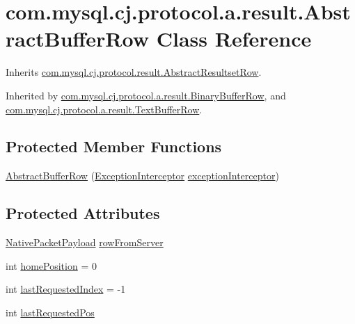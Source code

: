 \hypertarget{classcom_1_1mysql_1_1cj_1_1protocol_1_1a_1_1result_1_1_abstract_buffer_row}{}\section{com.\+mysql.\+cj.\+protocol.\+a.\+result.\+Abstract\+Buffer\+Row Class Reference}
\label{classcom_1_1mysql_1_1cj_1_1protocol_1_1a_1_1result_1_1_abstract_buffer_row}


Inherits \mbox{\hyperlink{classcom_1_1mysql_1_1cj_1_1protocol_1_1result_1_1_abstract_resultset_row}{com.\+mysql.\+cj.\+protocol.\+result.\+Abstract\+Resultset\+Row}}.



Inherited by \mbox{\hyperlink{classcom_1_1mysql_1_1cj_1_1protocol_1_1a_1_1result_1_1_binary_buffer_row}{com.\+mysql.\+cj.\+protocol.\+a.\+result.\+Binary\+Buffer\+Row}}, and \mbox{\hyperlink{classcom_1_1mysql_1_1cj_1_1protocol_1_1a_1_1result_1_1_text_buffer_row}{com.\+mysql.\+cj.\+protocol.\+a.\+result.\+Text\+Buffer\+Row}}.

\subsection*{Protected Member Functions}
\begin{DoxyCompactItemize}
\item 
\mbox{\hyperlink{classcom_1_1mysql_1_1cj_1_1protocol_1_1a_1_1result_1_1_abstract_buffer_row_a08349d40ae79d6ead1baec4a471ee3f0}{Abstract\+Buffer\+Row}} (\mbox{\hyperlink{interfacecom_1_1mysql_1_1cj_1_1exceptions_1_1_exception_interceptor}{Exception\+Interceptor}} \mbox{\hyperlink{classcom_1_1mysql_1_1cj_1_1protocol_1_1result_1_1_abstract_resultset_row_a50c0daccb2e9e7e2445af4a09d6fb9d0}{exception\+Interceptor}})
\end{DoxyCompactItemize}
\subsection*{Protected Attributes}
\begin{DoxyCompactItemize}
\item 
\mbox{\hyperlink{classcom_1_1mysql_1_1cj_1_1protocol_1_1a_1_1_native_packet_payload}{Native\+Packet\+Payload}} \mbox{\hyperlink{classcom_1_1mysql_1_1cj_1_1protocol_1_1a_1_1result_1_1_abstract_buffer_row_a7cf03826ff7d879810ca7d23472a49f5}{row\+From\+Server}}
\item 
int \mbox{\hyperlink{classcom_1_1mysql_1_1cj_1_1protocol_1_1a_1_1result_1_1_abstract_buffer_row_a38cbe12c531c96a8ba04b80fee493a5b}{home\+Position}} = 0
\item 
int \mbox{\hyperlink{classcom_1_1mysql_1_1cj_1_1protocol_1_1a_1_1result_1_1_abstract_buffer_row_a3ac289decb8f1f479611dafef6e45086}{last\+Requested\+Index}} = -\/1
\item 
int \mbox{\hyperlink{classcom_1_1mysql_1_1cj_1_1protocol_1_1a_1_1result_1_1_abstract_buffer_row_a3a7cb8406241de42bddb1ea0db5f0808}{last\+Requested\+Pos}}
\end{DoxyCompactItemize}
